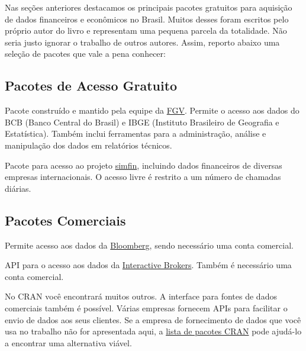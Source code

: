 \documentclass[
  11pt,
]{book}
\providecommand{\tightlist}{%
  \setlength{\itemsep}{0pt}\setlength{\parskip}{0pt}}
\begin{document}
Nas seções anteriores destacamos os principais pacotes gratuitos para aquisição de dados financeiros e econômicos no Brasil. Muitos desses foram escritos pelo próprio autor do livro e representam uma pequena parcela da totalidade. Não seria justo ignorar o trabalho de outros autores. Assim, reporto abaixo uma seleção de pacotes que vale a pena conhecer:

\hypertarget{pacotes-de-acesso-gratuito}{%
\subsection{Pacotes de Acesso Gratuito}\label{pacotes-de-acesso-gratuito}}

\begin{description}
\tightlist
\item[\texttt{BETS} \citep{R-BETS}]
Pacote construído e mantido pela equipe da \href{http://portal.fgv.br/en}{FGV}. Permite o acesso aos dados do BCB (Banco Central do Brasil) e IBGE (Instituto Brasileiro de Geografia e Estatística). Também inclui ferramentas para a administração, análise e manipulação dos dados em relatórios técnicos.
\item[\texttt{simfinapi} \citep{R-simfinapi}]
Pacote para acesso ao projeto \href{https://simfin.com/}{simfin}, incluindo dados financeiros de diversas empresas internacionais. O acesso livre é restrito a um número de chamadas diárias.
\end{description}

\hypertarget{pacotes-comerciais}{%
\subsection{Pacotes Comerciais}\label{pacotes-comerciais}}

\begin{description}
\tightlist
\item[\texttt{Rblpapi} \citep{R-Rblpapi}]
Permite acesso aos dados da \href{https://www.bloomberg.com/}{Bloomberg}, sendo necessário uma conta comercial.
\item[\texttt{IBrokers} \citep{R-IBrokers}]
API para o acesso aos dados da \href{https://www.interactivebrokers.com/en/home.php}{Interactive Brokers}. Também é necessário uma conta comercial.
\end{description}

No CRAN você encontrará muitos outros. A interface para fontes de dados comerciais também é possível. Várias empresas fornecem APIs para facilitar o envio de dados aos seus clientes. Se a empresa de fornecimento de dados que você usa no trabalho não for apresentada aqui, a \href{https://cran.r-project.org/}{lista de pacotes CRAN} pode ajudá-lo a encontrar uma alternativa viável.
\end{document}
